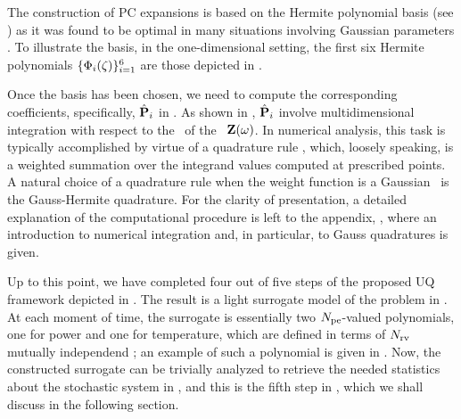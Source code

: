 
The construction of PC expansions is based on the Hermite polynomial basis (see ) as it was found to be optimal in many situations involving Gaussian parameters \cite{xiu2002}. To illustrate the basis, in the one-dimensional setting, the first six Hermite polynomials $\{ \Phi_i(\zeta) \}_{i = 1}^6$ are those depicted in .

Once the basis has been chosen, we need to compute the corresponding coefficients, specifically, $\hat{\mathbf{P}}_i$ in . As shown in , $\hat{\mathbf{P}}_i$ involve multidimensional integration with respect to the \pdf\ of the \rvs\ $\mathbf{Z}(\omega)$. In numerical analysis, this task is typically accomplished by virtue of a quadrature rule \cite{press2007}, which, loosely speaking, is a weighted summation over the integrand values computed at prescribed points. A natural choice of a quadrature rule when the weight function is a Gaussian \pdf\ is the Gauss-Hermite quadrature. For the clarity of presentation, a detailed explanation of the computational procedure is left to the appendix, , where an introduction to numerical integration and, in particular, to Gauss quadratures is given.

Up to this point, we have completed four out of five steps of the proposed UQ framework depicted in . The result is a light surrogate model of the problem in . At each moment of time, the surrogate is essentially two ${N_\text{pe}}$-valued polynomials, one for power and one for temperature, which are defined in terms of ${N_\text{rv}}$ mutually independend \rvs; an example of such a polynomial is given in . Now, the constructed surrogate can be trivially analyzed to retrieve the needed statistics about the stochastic system in , and this is the fifth step in , which we shall discuss in the following section.
